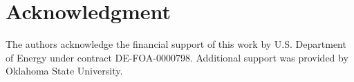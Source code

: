 \documentclass[preprint,sort&compress]{elsarticle}
\begin{document}
	
	\section*{Acknowledgment}
	
		The authors acknowledge the financial support of this work by U.S. Department of Energy under contract DE-FOA-0000798.
		Additional support was provided by Oklahoma State University. 
	
	
	
	
\end{document}
